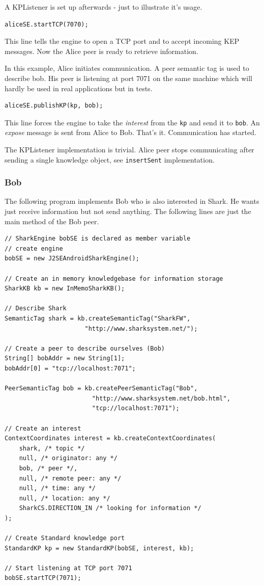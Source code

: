 A KPListener is set up afterwards - just to illustrate it's usage.

\begin{verbatim}
aliceSE.startTCP(7070);
\end{verbatim}

This line tells the engine to open a TCP port and to accept incoming KEP messages. Now the Alice peer is ready to retrieve information. 

In this example, Alice initiates communication. A peer semantic tag is used to describe bob. His peer is listening at port 7071 on the same machine which will hardly be used in real applications but in tests.

\begin{verbatim}
aliceSE.publishKP(kp, bob);
\end{verbatim}

This line forces the engine to take the {\it interest} from the {\tt kp} and send it to {\tt bob}. An {\it expose} message is sent from Alice to Bob. That's it. Communication has started.

The KPListener implementation is trivial. Alice peer stops communicating after sending a single knowledge object, see {\tt insertSent} implementation.

\subsubsection{Bob}
The following program implements Bob who is also interested in Shark. He wants just receive information but not send anything. The following lines are just the main method of the Bob peer.

\begin{verbatim}
// SharkEngine bobSE is declared as member variable
// create engine
bobSE = new J2SEAndroidSharkEngine();

// Create an in memory knowledgebase for information storage
SharkKB kb = new InMemoSharkKB();

// Describe Shark
SemanticTag shark = kb.createSemanticTag("SharkFW", 
                      "http://www.sharksystem.net/");

// Create a peer to describe ourselves (Bob)
String[] bobAddr = new String[1];
bobAddr[0] = "tcp://localhost:7071";

PeerSemanticTag bob = kb.createPeerSemanticTag("Bob", 
                        "http://www.sharksystem.net/bob.html", 
                        "tcp://localhost:7071");

// Create an interest 
ContextCoordinates interest = kb.createContextCoordinates(
    shark, /* topic */ 
    null, /* originator: any */
    bob, /* peer */,
    null, /* remote peer: any */ 
    null, /* time: any */
    null, /* location: any */ 
    SharkCS.DIRECTION_IN /* looking for information */
);

// Create Standard knowledge port
StandardKP kp = new StandardKP(bobSE, interest, kb);

// Start listening at TCP port 7071
bobSE.startTCP(7071);
\end{verbatim}


